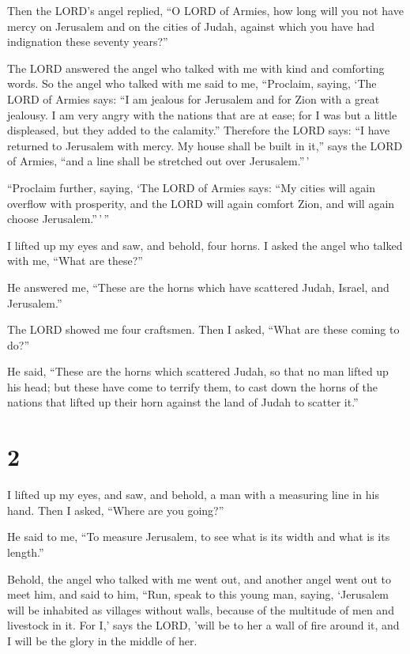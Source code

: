  Then the LORD's angel replied, ``O LORD of Armies, how
long will you not have mercy on Jerusalem and on the cities of Judah,
against which you have had indignation these seventy years?''

 The LORD answered the angel who talked with me with kind
and comforting words.  So the angel who talked with me
said to me, ``Proclaim, saying, `The LORD of Armies says: ``I am jealous
for Jerusalem and for Zion with a great jealousy.  I am
very angry with the nations that are at ease; for I was but a little
displeased, but they added to the calamity.''  Therefore
the LORD says: ``I have returned to Jerusalem with mercy. My house shall
be built in it,'' says the LORD of Armies, ``and a line shall be
stretched out over Jerusalem.''\,'

 ``Proclaim further, saying, `The LORD of Armies says:
``My cities will again overflow with prosperity, and the LORD will again
comfort Zion, and will again choose Jerusalem.''\,'\,''

 I lifted up my eyes and saw, and behold, four horns.
 I asked the angel who talked with me, ``What are
these?''

He answered me, ``These are the horns which have scattered Judah,
Israel, and Jerusalem.''

 The LORD showed me four craftsmen.  Then
I asked, ``What are these coming to do?''

He said, ``These are the horns which scattered Judah, so that no man
lifted up his head; but these have come to terrify them, to cast down
the horns of the nations that lifted up their horn against the land of
Judah to scatter it.''

\hypertarget{section-1}{%
\section{2}\label{section-1}}

 I lifted up my eyes, and saw, and behold, a man with a
measuring line in his hand.  Then I asked, ``Where are you
going?''

He said to me, ``To measure Jerusalem, to see what is its width and what
is its length.''

 Behold, the angel who talked with me went out, and
another angel went out to meet him,  and said to him,
``Run, speak to this young man, saying, `Jerusalem will be inhabited as
villages without walls, because of the multitude of men and livestock in
it.  For I,' says the LORD, 'will be to her a wall of fire
around it, and I will be the glory in the middle of her.

